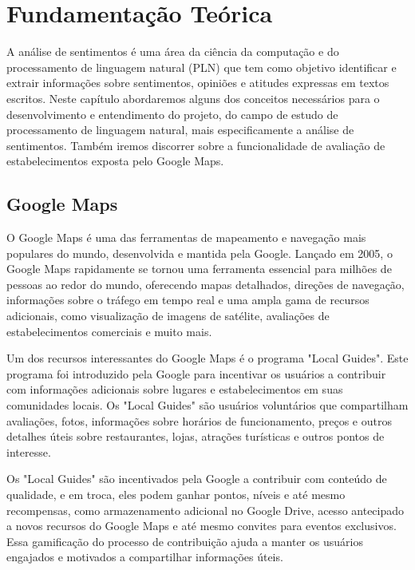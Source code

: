 \chapter{Fundamentação Teórica}
\label{cap:fund_teorica}

A análise de sentimentos é uma área da ciência da computação e do processamento de linguagem natural (PLN) que tem como objetivo identificar e extrair informações sobre sentimentos, opiniões e atitudes expressas em textos escritos.
Neste capítulo abordaremos alguns dos conceitos necessários para o desenvolvimento e entendimento do projeto, do campo de estudo de processamento de linguagem natural, mais especificamente a análise de sentimentos. Também iremos discorrer sobre a funcionalidade de avaliação de estabelecimentos exposta pelo Google Maps.

\section{Google Maps}
\label{cap:fund_teorica:sec:google_maps}

O Google Maps é uma das ferramentas de mapeamento e navegação mais populares do mundo, desenvolvida e mantida pela Google. Lançado em 2005, o Google Maps rapidamente se tornou uma ferramenta essencial para milhões de pessoas ao redor do mundo, oferecendo mapas detalhados, direções de navegação, informações sobre o tráfego em tempo real e uma ampla gama de recursos adicionais, como visualização de imagens de satélite, avaliações de estabelecimentos comerciais e muito mais.

Um dos recursos interessantes do Google Maps é o programa "Local Guides". Este programa foi introduzido pela Google para incentivar os usuários a contribuir com informações adicionais sobre lugares e estabelecimentos em suas comunidades locais. Os "Local Guides" são usuários voluntários que compartilham avaliações, fotos, informações sobre horários de funcionamento, preços e outros detalhes úteis sobre restaurantes, lojas, atrações turísticas e outros pontos de interesse.

Os "Local Guides" são incentivados pela Google a contribuir com conteúdo de qualidade, e em troca, eles podem ganhar pontos, níveis e até mesmo recompensas, como armazenamento adicional no Google Drive, acesso antecipado a novos recursos do Google Maps e até mesmo convites para eventos exclusivos. Essa gamificação do processo de contribuição ajuda a manter os usuários engajados e motivados a compartilhar informações úteis.

